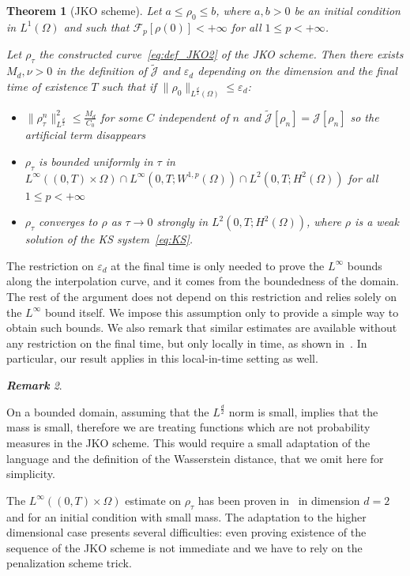 \documentclass[a4paper,twosided, 11pt]{article}
\renewcommand{\color}[2][]{}
\newcommand{\eps}{\varepsilon}
\theoremstyle{plain}
\newtheorem{thm}{Theorem}[section]
\theoremstyle{remark}
\newtheorem{remark}[thm]{\bf Remark}
\numberwithin{equation}{section}
\begin{document}
\begin{thm}[JKO scheme]\label{thm:JKO}
Let $a\le \rho_{0}\le b$, where $a,b>0$ be an initial condition in $L^1(\Omega)$ and such that $\mathcal{F}_{p}[\rho(0)]<+\infty$ for all $1\le p<+\infty$. {\color{blue} Let $\rho_{\tau}$ the constructed curve~\eqref{eq:def_JKO2} of the JKO scheme.   Then there exists  $M_d,\nu >0$ in the definition of $\widetilde{\mathcal{J}}$  and $\eps_{d}$ depending on the dimension and the final time of existence $T$ such that if $\|\rho_0\|_{L^{\frac{d}{2}}(\Omega)}\le \eps_d$:
\begin{itemize}
    \item $\|\rho_{\tau}^{n}\|_{L^{\frac d2}}^2\le \frac{M_d}{C_0}$ for some $C$ independent of $n$ and $\widetilde{\mathcal J}[\rho_n]=\mathcal J[\rho_n]$ so the artificial term disappears
    \item $\rho_{\tau}$ is bounded uniformly in $\tau$ in $L^{\infty}((0,T)\times\Omega)\cap L^{\infty}(0,T; W^{1,p}(\Omega))\cap L^{2}(0,T; H^{2}(\Omega))$ for all $1\le p<+\infty$
    \item $\rho_{\tau}$ converges to $\rho$ as $\tau\to 0$ strongly in $L^{2}(0,T; H^{2}(\Omega))$, where $\rho$ is a weak solution of the KS system~\eqref{eq:KS}.
\end{itemize}}
\end{thm}

{\color{blue}
The restriction on $\varepsilon_d$ at the final time is only needed to prove the $L^\infty$ bounds along the interpolation curve, and it comes from the boundedness of the domain. The rest of the argument does not depend on this restriction and relies solely on the $L^\infty$ bound itself. We impose this assumption only to provide a simple way to obtain such bounds. We also remark that similar estimates are available without any restriction on the final time, but only locally in time, as shown in~\cite{carrillo2018}. In particular, our result applies in this local-in-time setting as well.}

\begin{remark}
\begin{enumerate}
{\color{blue}\item On a bounded domain, assuming that  the $L^{\frac d2}$ norm is small, implies that the mass is small, therefore we are treating functions which are not probability measures in the JKO scheme. This would require a small adaptation of the language and the definition of the Wasserstein distance, that we omit here for simplicity. 
\item The $L^{\infty}((0,T)\times\Omega)$ estimate on $\rho_{\tau}$ has been proven in~\cite{dimarino} in dimension $d=2$ and for an initial condition with small mass. The adaptation to the higher dimensional case presents several difficulties: even proving existence of the sequence of the JKO scheme is not immediate and we have to rely on the penalization scheme trick. 
}
\end{enumerate}
\end{remark}
\end{document}
